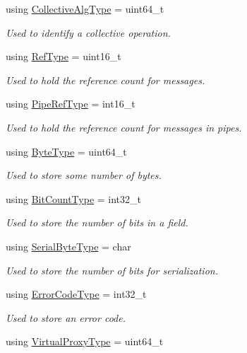 \begin{DoxyCompactItemize}
using \hyperlink{namespacevt_a5ffcf8e168b77b0f36e11b616049a1cf}{Collective\+Alg\+Type} = uint64\+\_\+t
\begin{DoxyCompactList}\small\item\em Used to identify a collective operation. \end{DoxyCompactList}\item 
using \hyperlink{namespacevt_a60fda95dc2316580f0ccf87d570f1d9e}{Ref\+Type} = uint16\+\_\+t
\begin{DoxyCompactList}\small\item\em Used to hold the reference count for messages. \end{DoxyCompactList}\item 
using \hyperlink{namespacevt_ace18d74dd489d9ea506d38789fffce34}{Pipe\+Ref\+Type} = int16\+\_\+t
\begin{DoxyCompactList}\small\item\em Used to hold the reference count for messages in pipes. \end{DoxyCompactList}\item 
using \hyperlink{namespacevt_aab8d55968084610ce3b17057981e9300}{Byte\+Type} = uint64\+\_\+t
\begin{DoxyCompactList}\small\item\em Used to store some number of bytes. \end{DoxyCompactList}\item 
using \hyperlink{namespacevt_acaf7da00eb37dfb0c3479a6a982c30ef}{Bit\+Count\+Type} = int32\+\_\+t
\begin{DoxyCompactList}\small\item\em Used to store the number of bits in a field. \end{DoxyCompactList}\item 
using \hyperlink{namespacevt_ad48e08beb69a7f184fb1fdb4b7044174}{Serial\+Byte\+Type} = char
\begin{DoxyCompactList}\small\item\em Used to store the number of bits for serialization. \end{DoxyCompactList}\item 
using \hyperlink{namespacevt_a793764d753923abc3d32929870beb485}{Error\+Code\+Type} = int32\+\_\+t
\begin{DoxyCompactList}\small\item\em Used to store an error code. \end{DoxyCompactList}\item 
using \hyperlink{namespacevt_a1b417dd5d684f045bb58a0ede70045ac}{Virtual\+Proxy\+Type} = uint64\+\_\+t

\end{DoxyCompactItemize}

